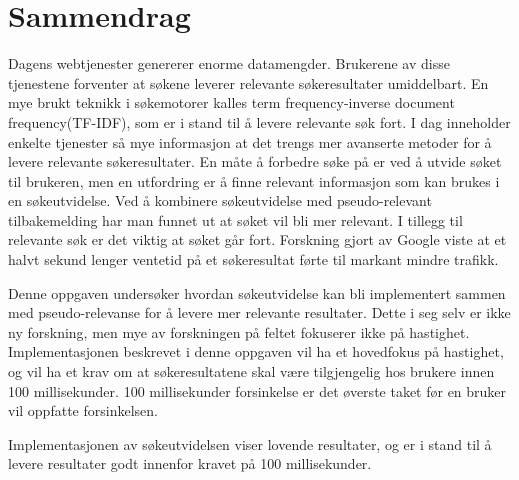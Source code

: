 \chapter*{Sammendrag}
Dagens webtjenester genererer enorme datamengder.
Brukerene av disse tjenestene forventer at søkene leverer relevante søkeresultater umiddelbart.
En mye brukt teknikk i søkemotorer kalles term frequency-inverse document frequency(TF-IDF),
som er i stand til å levere relevante søk fort.
I dag inneholder enkelte tjenester så mye informasjon at det trengs mer avanserte metoder for å levere relevante søkeresultater.
En måte å forbedre søke på er ved å utvide søket til brukeren,
men en utfordring er å finne relevant informasjon som kan brukes i en søkeutvidelse.
Ved å kombinere søkeutvidelse med pseudo-relevant tilbakemelding har man funnet ut at søket vil bli mer relevant.
I tillegg til relevante søk er det viktig at søket går fort.
Forskning gjort av Google \cite{google-marissa} viste at et halvt sekund lenger ventetid på et søkeresultat
førte til markant mindre trafikk.

Denne oppgaven undersøker hvordan søkeutvidelse kan bli implementert sammen med pseudo-relevanse
for å levere mer relevante resultater.
Dette i seg selv er ikke ny forskning,
men mye av forskningen på feltet fokuserer ikke på hastighet.
Implementasjonen beskrevet i denne oppgaven vil ha et hovedfokus på hastighet,
og vil ha et krav om at søkeresultatene skal være tilgjengelig hos brukere innen 100 millisekunder.
100 millisekunder forsinkelse er det øverste taket før en bruker vil oppfatte forsinkelsen.

Implementasjonen av søkeutvidelsen viser lovende resultater,
og er i stand til å levere resultater godt innenfor kravet på 100 millisekunder.

